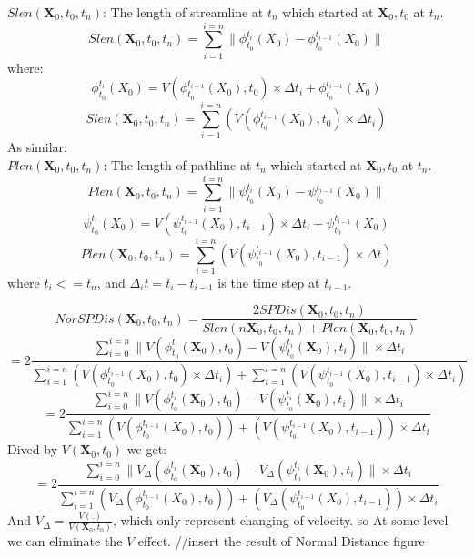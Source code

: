 \documentclass[
     11pt,         %
     a4paper,      %
     oneside,
     ]{article}
\newcommand{\vect}[1]{\boldsymbol{#1}}
\begin{document}
	 $Slen(\vect{X}_{0},t_{0},t_{n})$: The length of streamline at $t_{n}$ which started at $\vect{X}_{0},t_{0}$ at $t_{n}$.
	 $$Slen(\vect{X}_{0},t_{0},t_{n})=\sum_{i=1}^{i=n}\biggr\lVert\phi_{t_{0}}^{t_{i}}(X_{0})-\phi_{t_{0}}^{t_{i-1}}(X_{0})\biggr\rVert$$
	 where:\\
	 $$\phi_{t_{0}}^{t_{i}}(X_{0})=V(\phi_{t_{0}}^{t_{i-1}}(X_{0}),t_{0})\times\Delta t_{i}+\phi_{t_{0}}^{t_{i-1}}(X_{0})$$
	 $$Slen(\vect{X}_{0},t_{0},t_{n})=\sum_{i=1}^{i=n}(V(\phi_{t_{0}}^{t_{i-1}}(X_{0}),t_{0})\times\Delta t_{i})$$
	 As similar:\\
	 $Plen(\vect{X}_{0},t_{0},t_{n})$: The length of pathline at $t_{n}$ which started at $\vect{X}_{0},t_{0}$ at $t_{n}$.
	 $$Plen(\vect{X}_{0},t_{0},t_{n})=\sum_{i=1}^{i=n}\biggr\lVert\psi_{t_{0}}^{t_{i}}(X_{0})-\psi_{t_{0}}^{t_{i-1}}(X_{0})\biggr\rVert$$
	 $$\psi_{t_{0}}^{t_{i}}(X_{0})=V(\psi_{t_{0}}^{t_{i-1}}(X_{0}),t_{i-1})\times\Delta t_{i}+\psi_{t_{0}}^{t_{i-1}}(X_{0})$$
	 $$Plen(\vect{X}_{0},t_{0},t_{n})=\sum_{i=1}^{i=n}(V(\psi_{t_{0}}^{t_{i-1}}(X_{0}),t_{i-1})\times\Delta t)$$
	 where $t_{i}<=t_{n}$, and $\Delta_{i} t=t_{i}-t_{i-1}$ is the time step at $t_{i-1}$.
	 
	 
	 $$NorSPDis(\vect{X}_{0},t_{0},t_{n})=\frac{2SPDis(\vect{X}_{0},t_{0},t_{n})}{Slen(n\vect{X}_{0},t_{0},t_{n})+Plen(\vect{X}_{0},t_{0},t_{n})}$$
	 $$=2\frac{\sum_{i=0}^{i=n}\biggr\lVert V(\phi_{t_{0}}^{t_{i}}(\vect{X}_{0}),t_{0})-V(\psi_{t_{0}}^{t_{i}}(\vect{X}_{0}),t_{i})\biggr\rVert\times\Delta t_{i}}{\sum_{i=1}^{i=n}(V(\phi_{t_{0}}^{t_{i-1}}(X_{0}),t_{0})\times\Delta t_{i})+\sum_{i=1}^{i=n}(V(\psi_{t_{0}}^{t_{i-1}}(X_{0}),t_{i-1})\times\Delta t_{i})}$$
	 $$=2\frac{\sum_{i=0}^{i=n}\biggr\lVert V(\phi_{t_{0}}^{t_{i}}(\vect{X}_{0}),t_{0})-V(\psi_{t_{0}}^{t_{i}}(\vect{X}_{0}),t_{i})\biggr\rVert\times\Delta t_{i}}{\sum_{i=1}^{i=n}(V(\phi_{t_{0}}^{t_{i-1}}(X_{0}),t_{0}))+(V(\psi_{t_{0}}^{t_{i-1}}(X_{0}),t_{i-1}))\times\Delta t_{i}}$$
	 Dived by $V(\vect{X}_{0},t_{0})$
	 we get:\\
	 $$=2\frac{\sum_{i=0}^{i=n}\biggr\lVert V_{\Delta}(\phi_{t_{0}}^{t_{i}}(\vect{X}_{0}),t_{0})-V_{\Delta}(\psi_{t_{0}}^{t_{i}}(\vect{X}_{0}),t_{i})\biggr\rVert\times\Delta t_{i}}{\sum_{i=1}^{i=n}(V_{\Delta}(\phi_{t_{0}}^{t_{i-1}}(X_{0}),t_{0}))+(V_{\Delta}(\psi_{t_{0}}^{t_{i-1}}(X_{0}),t_{i-1}))\times\Delta t_{i}}$$
	 And $V_{\Delta}=\frac{V(.)}{V(\vect{X}_{0},t_{0})}$, which only represent changing of velocity. so
	 At some level we can eliminate the $V$ effect.
	 //insert the result of Normal Distance figure
\end{document}

